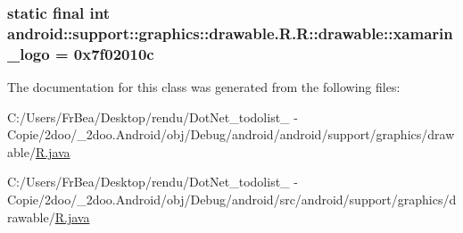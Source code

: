 \hypertarget{classandroid_1_1support_1_1graphics_1_1drawable_1_1_r_1_1drawable_7dee181dfe9fa76c2aeeaa4930cfe4db}{
\subsubsection[{xamarin\_\-logo}]{\setlength{\rightskip}{0pt plus 5cm}static final int android::support::graphics::drawable.R.R::drawable::xamarin\_\-logo = 0x7f02010c}}
\label{classandroid_1_1support_1_1graphics_1_1drawable_1_1_r_1_1drawable_7dee181dfe9fa76c2aeeaa4930cfe4db}




The documentation for this class was generated from the following files:\begin{CompactItemize}
\item 
C:/Users/FrBea/Desktop/rendu/DotNet\_\-todolist\_ - Copie/2doo/\_\-2doo.Android/obj/Debug/android/android/support/graphics/drawable/\hyperlink{android_2support_2graphics_2drawable_2_r_8java}{R.java}\item 
C:/Users/FrBea/Desktop/rendu/DotNet\_\-todolist\_ - Copie/2doo/\_\-2doo.Android/obj/Debug/android/src/android/support/graphics/drawable/\hyperlink{src_2android_2support_2graphics_2drawable_2_r_8java}{R.java}\end{CompactItemize}
